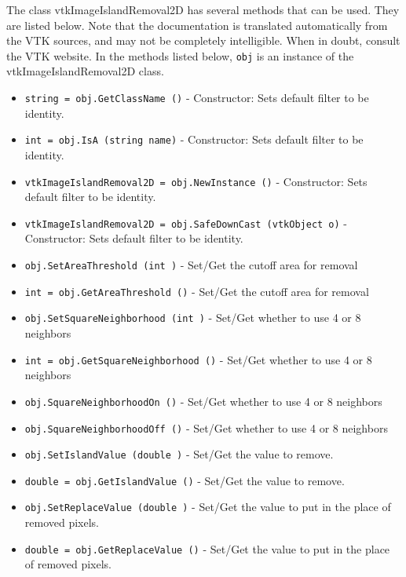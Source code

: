 The class vtkImageIslandRemoval2D has several methods that can be used.
  They are listed below.
Note that the documentation is translated automatically from the VTK sources,
and may not be completely intelligible.  When in doubt, consult the VTK website.
In the methods listed below, \verb|obj| is an instance of the vtkImageIslandRemoval2D class.
\begin{itemize}
\item  \verb|string = obj.GetClassName ()| -  Constructor: Sets default filter to be identity.

\item  \verb|int = obj.IsA (string name)| -  Constructor: Sets default filter to be identity.

\item  \verb|vtkImageIslandRemoval2D = obj.NewInstance ()| -  Constructor: Sets default filter to be identity.

\item  \verb|vtkImageIslandRemoval2D = obj.SafeDownCast (vtkObject o)| -  Constructor: Sets default filter to be identity.

\item  \verb|obj.SetAreaThreshold (int )| -  Set/Get the cutoff area for removal

\item  \verb|int = obj.GetAreaThreshold ()| -  Set/Get the cutoff area for removal

\item  \verb|obj.SetSquareNeighborhood (int )| -  Set/Get whether to use 4 or 8 neighbors

\item  \verb|int = obj.GetSquareNeighborhood ()| -  Set/Get whether to use 4 or 8 neighbors

\item  \verb|obj.SquareNeighborhoodOn ()| -  Set/Get whether to use 4 or 8 neighbors

\item  \verb|obj.SquareNeighborhoodOff ()| -  Set/Get whether to use 4 or 8 neighbors

\item  \verb|obj.SetIslandValue (double )| -  Set/Get the value to remove.

\item  \verb|double = obj.GetIslandValue ()| -  Set/Get the value to remove.

\item  \verb|obj.SetReplaceValue (double )| -  Set/Get the value to put in the place of removed pixels.

\item  \verb|double = obj.GetReplaceValue ()| -  Set/Get the value to put in the place of removed pixels.

\end{itemize}
